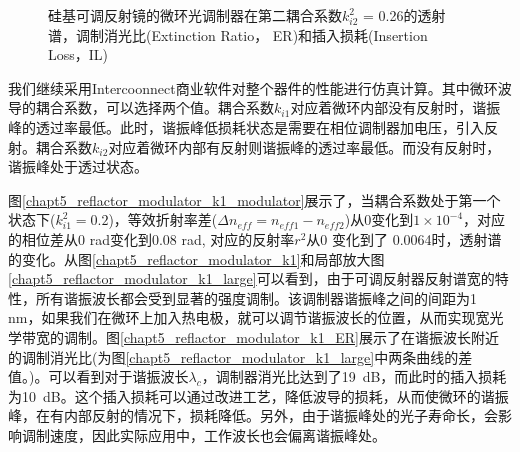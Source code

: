\begin{figure}[htb]
{\begin{minipage}[]{0.5\textwidth}
		\end{minipage}}		
	\caption{硅基可调反射镜的微环光调制器在第二耦合系数$k_{i2}^2$ = 0.26的透射谱，调制消光比(Extinction Ratio， ER)和插入损耗(Insertion Loss，IL)}
	\label{chapt5_reflactor_modulator_k2_modulator}	
\end{figure}	
我们继续采用Intercoonnect商业软件对整个器件的性能进行仿真计算。其中微环波导的耦合系数，可以选择两个值。耦合系数$k_{i1}$对应着微环内部没有反射时，谐振峰的透过率最低。此时，谐振峰低损耗状态是需要在相位调制器加电压，引入反射。耦合系数$k_{i2}$对应着微环内部有反射则谐振峰的透过率最低。而没有反射时，谐振峰处于透过状态。

图\ref{chapt5_reflactor_modulator_k1_modulator}展示了，当耦合系数处于第一个状态下($k_{i1}^2 = 0.2$)，等效折射率差($\Delta n_{eff} = n_{eff1}-n_{eff2}$)从0变化到$1 \times  10^{-4}$，对应的相位差从0 rad变化到0.08 rad, 对应的反射率$r^2$从0 变化到了 0.0064时，透射谱的变化。从图\ref{chapt5_reflactor_modulator_k1}和局部放大图\ref{chapt5_reflactor_modulator_k1_large}可以看到，由于可调反射器反射谱宽的特性，所有谐振波长都会受到显著的强度调制。该调制器谐振峰之间的间距为1 nm，如果我们在微环上加入热电极，就可以调节谐振波长的位置，从而实现宽光学带宽的调制。图\ref{chapt5_reflactor_modulator_k1_ER}展示了在谐振波长附近的调制消光比(为图\ref{chapt5_reflactor_modulator_k1_large}中两条曲线的差值。)。可以看到对于谐振波长$\lambda_c$，调制器消光比达到了19~dB，而此时的插入损耗为10~dB。这个插入损耗可以通过改进工艺，降低波导的损耗，从而使微环的谐振峰，在有内部反射的情况下，损耗降低。另外，由于谐振峰处的光子寿命长，会影响调制速度，因此实际应用中，工作波长也会偏离谐振峰处。

